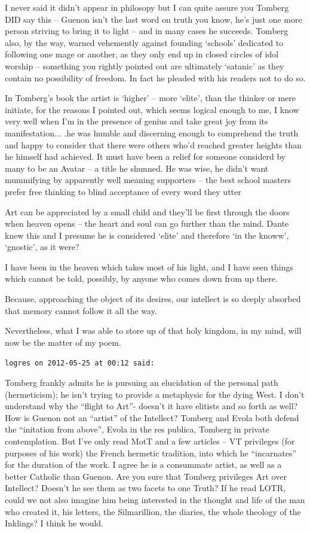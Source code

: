\begin{footnotesize}
\begin{sffamily}
I never said it didn't appear in philosopy but I can quite assure you Tomberg DID say this -- Guenon isn't the last word on truth you know, he's just one more person striving to bring it to light -- and in many cases he succeeds. Tomberg also, by the way, warned vehemently against founding `schools' dedicated to following one mage or another, as they only end up in closed circles of idol worship -- something you rightly pointed out are ultimately `satanic' as they contain no possibility of freedom. In fact he pleaded with his readers not to do so.

In Tomberg's book the artist is `higher' -- more `elite', than the thinker or mere initiate, for the reasons I pointed out, which seems logical enough to me, I know very well when I'm in the presence of genius and take great joy from its manifestation... .he was humble and discerning enough to comprehend the truth and happy to consider that there were others who'd reached greater heights than he himself had achieved. It must have been a relief for someone considerd by many to be an Avatar -- a title he shunned. He was wise, he didn't want mummifying by apparently well meaning supporters -- the best school masters prefer free thinking to blind acceptance of every word they utter

Art can be appreciated by a small child and they'll be first through the doors when heaven opens -- the heart and soul can go further than the mind. Dante knew this and I presume he is considered `elite' and therefore `in the knoww', `gnostic', as it were?

I have been in the heaven which takes most of his light, and I have seen things which cannot be told, possibly, by anyone who comes down from up there.

Because, approaching the object of its desires, our intellect is so deeply absorbed that memory cannot follow it all the way.

Nevertheless, what I was able to store up of that holy kingdom, in my mind, will now be the matter of my poem.

\hfill

\texttt{logres on 2012-05-25 at 00:12 said:}

Tomberg frankly admits he is pursuing an elucidation of the personal path (hermeticism); he isn't trying to provide a metaphysic for the dying West. I don't understand why the ``flight to Art''- doesn't it have elitists and so forth as well? How is Guenon not an ``artist'' of the Intellect? Tomberg and Evola both defend the ``initation from above'', Evola in the res publica, Tomberg in private contemplation. But I've only read MotT and a few articles -- VT privileges (for purposes of his work) the French hermetic tradition, into which he ``incarnates'' for the duration of the work. I agree he is a consummate artist, as well as a better Catholic than Guenon. Are you sure that Tomberg privileges Art over Intellect? Doesn't he see them as two facets to one Truth? If he read LOTR, could we not also imagine him being interested in the thought and life of the man who created it, his letters, the Silmarillion, the diaries, the whole theology of the Inklings? I think he would.


\end{sffamily}
\end{footnotesize}
